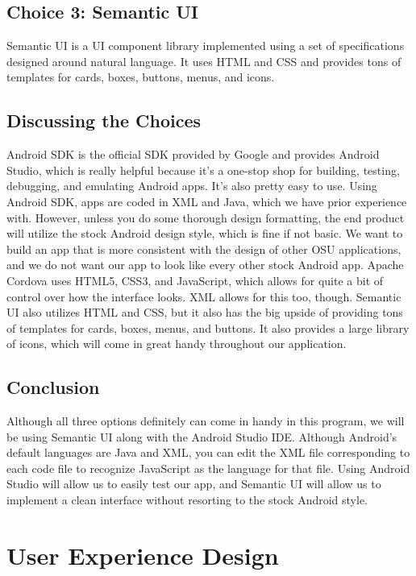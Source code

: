 \documentclass[draftclsnofoot, onecolumn, 10pt, compsoc]{IEEEtran}
\begin{document}
		\subsection{Choice 3: Semantic UI}
			Semantic UI is a UI component library implemented using a set of specifications designed around natural language. It uses HTML and CSS and provides tons of templates for cards, boxes, buttons, menus, and icons. 
			~\cite{Semantic_UI}
		
		\subsection{Discussing the Choices}
			Android SDK is the official SDK provided by Google and provides Android Studio, which is really helpful because it's a one-stop shop for building, testing, debugging, and emulating Android apps. It's also pretty easy to use. Using Android SDK, apps are coded in XML and Java, which we have prior experience with. However, unless you do some thorough design formatting, the end product will utilize the stock Android design style, which is fine if not basic. We want to build an app that is more consistent with the design of other OSU applications, and we do not want our app to look like every other stock Android app. Apache Cordova uses HTML5, CSS3, and JavaScript, which allows for quite a bit of control over how the interface looks. XML allows for this too, though. Semantic UI also utilizes HTML and CSS, but it also has the big upside of providing tons of templates for cards, boxes, menus, and buttons. It also provides a large library of icons, which will come in great handy throughout our application.
		
		\subsection{Conclusion}
			Although all three options definitely can come in handy in this program, we will be using Semantic UI along with the Android Studio IDE. Although Android's default languages are Java and XML, you can edit the XML file corresponding to each code file to recognize JavaScript as the language for that file. Using Android Studio will allow us to easily test our app, and Semantic UI will allow us to implement a clean interface without resorting to the stock Android style.
			~\cite{SemanticUI_JS}
		
	\section{User Experience Design}
\end{document}
